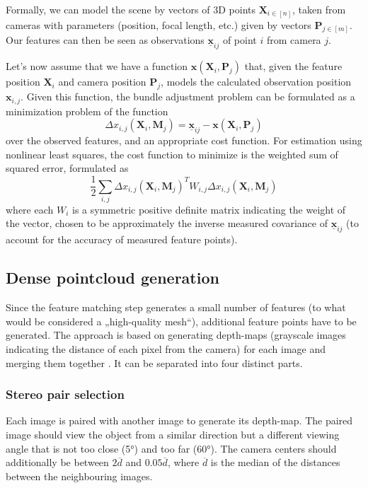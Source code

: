Formally, we can model the scene by vectors of 3D points $\mathbf{X}_{i \in [n]}$, taken from cameras with parameters (position, focal length, etc.) given by vectors $\mathbf{P}_{j \in [m]}$.
Our features can then be seen as observations $\underline{\bm{x}}_{ij}$ of point $i$ from camera $j$.

Let's now assume that we have a function $\bm{x}(\mathbf{X}_i, \mathbf{P}_j)$ that, given the feature position $\mathbf{X}_i$ and camera position $\mathbf{P}_j$, models the calculated observation position $\mathbf{x}_{i, j}$.
Given this function, the bundle adjustment problem can be formulated as a minimization problem of the function \begin{equation} \Delta x_{i, j} (\mathbf{X}_i, \mathbf{M}_j) = \underline{\bm{x}}_{ij} - \bm{x}(\mathbf{X}_i, \mathbf{P}_j) \end{equation}
over the observed features, and an appropriate cost function. For estimation using nonlinear least squares, the cost function to minimize is the weighted sum of squared error, formulated as 
\begin{equation} \frac{1}{2} \sum_{i,j} \Delta x_{i, j} (\mathbf{X}_i, \mathbf{M}_j)^T W_{i,j} \Delta x_{i, j} (\mathbf{X}_i, \mathbf{M}_j) \end{equation}
where each $W_i$ is a symmetric positive definite matrix indicating the weight of the vector, chosen to be approximately the inverse measured covariance of $\underline{\bm{x}}_{ij}$ (to account for the accuracy of measured feature points).

\subsection{Dense pointcloud generation}
Since the feature matching step generates a small number of features (to what would be considered a „high-quality mesh“), additional feature points have to be generated.
The approach is based on generating depth-maps (grayscale images indicating the distance of each pixel from the camera) for each image and merging them together \cite{shen2013accurate}.
It can be separated into four distinct parts.

\subsubsection{Stereo pair selection}
Each image is paired with another image to generate its depth-map.
The paired image should view the object from a similar direction but a different viewing angle that is not too close (\ang{5}) and too far (\ang{60}).
The camera centers should additionally be between $2 \overline{d}$ and $0.05 \overline{d}$, where $\overline{d}$ is the median of the distances between the neighbouring images.


